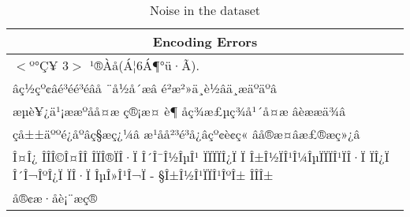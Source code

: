 \begin{table}[!htbp]
\vspace{0.5cm}

\begin{tabular}{|p{\textwidth}|}
\hline
\multicolumn{1}{|c|}{\textbf{Encoding Errors}} \\
\hline
$<$º°Ç¥ 3$>$ ¹®Àå(Á¦6Á¶°ü·Ã).\\
âç½çº¢âé³éé³éâå ¨å½å´æâ é²æ²»ä¸è½âä¸æäºäºâ\\
æµè¥¿ä¹¡ææºåå¤æ ç®¡æ¤ è¶ åç¾æ£µç¾å¹´å¤æ âèææä¾â\\
çå±±äººé¿åºâç§æç¿¼â æ¹åå²³é³å¿âçº¢è¢ç« âå®æ¤âæ£®æç»¿â\\
Î¤Î¿ ÎÎÎ©Î¤ÎÎ ÎÏÎ®ÏÎ·Ï Î´Î¯Î½ÎµÎ¹ ÏÏÏÏÎ¿Ï Ï Î±Î½ÏÎ¹Î¼ÎµÏÏÏÎ¹ÏÎ·Ï ÏÎ¿Ï Î´Î¬ÎºÎ¿Ï ÏÎ·Ï ÎµÎ»Î¹Î¬Ï - §Î±Î½Î¹ÏÏÎ¹ÎºÎ± ÎÎÎ±\\
å®¢æ·åè¡¨æç®\\
\hline
\end{tabular}
\caption{Noise in the \VSI{} dataset}
\label{tab:04_noise}
\end{table}
